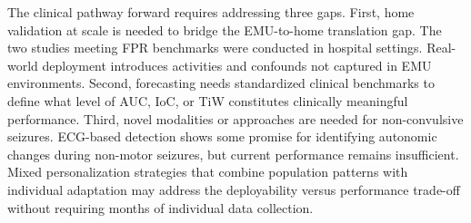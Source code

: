 The clinical pathway forward requires addressing three gaps. First, home validation at scale is needed to bridge the EMU-to-home translation gap. The two studies meeting FPR benchmarks were conducted in hospital settings. Real-world deployment introduces activities and confounds not captured in EMU environments. Second, forecasting needs standardized clinical benchmarks to define what level of AUC, IoC, or TiW constitutes clinically meaningful performance. Third, novel modalities or approaches are needed for non-convulsive seizures. ECG-based detection shows some promise for identifying autonomic changes during non-motor seizures, but current performance remains insufficient. Mixed personalization strategies that combine population patterns with individual adaptation may address the deployability versus performance trade-off without requiring months of individual data collection.
